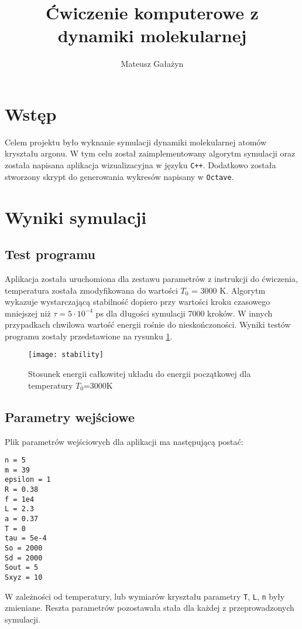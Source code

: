 \documentclass[a4paper,10pt]{article}
\author{Mateusz Gałażyn}
\title{Ćwiczenie komputerowe z dynamiki molekularnej}
\begin{document}
	\maketitle
	\section{Wstęp}
	Celem projektu było wyknanie symulacji dynamiki molekularnej atomów kryształu argonu. W tym celu został zaimplementowany algorytm symulacji oraz została napisana aplikacja wizualizacyjna w języku \verb|C++|. Dodatkowo została stworzony skrypt do generowania wykresów napisany w \verb|Octave|.
	\section{Wyniki symulacji}
	\subsection{Test programu}
	Aplikacja została uruchomiona dla zestawu parametrów z instrukcji do ćwiczenia, temperatura została zmodyfikowana do wartości $T_0$ = 3000 K. Algorytm wykazuje wystarczającą stabilność dopiero przy wartości kroku czasowego mniejszej niż $\tau = 5 \cdot 10^{-4}$ ps dla długości symulacji 7000 kroków. W innych przypadkach chwilowa wartość energii rośnie do nieskończoności. Wyniki testów programu zostały przedstawione na rysunku \ref{performance}.
	\begin{figure}[h]
	    \centering
	    \texttt{[image: stability]}
	    \caption{Stosunek energii całkowitej układu do energii początkowej dla temperatury $T_0$=3000K}
		\label{performance}
	\end{figure}
	\subsection{Parametry wejściowe}
	Plik parametrów wejściowych dla aplikacji ma następującą postać:
	\begin{verbatim}
n = 5
m = 39
epsilon = 1
R = 0.38
f = 1e4
L = 2.3
a = 0.37
T = 0
tau = 5e-4
So = 2000
Sd = 2000
Sout = 5
Sxyz = 10
	\end{verbatim}
	W zależności od temperatury, lub wymiarów kryształu parametry \verb|T|, \verb|L|, \verb|n| były zmieniane. Reszta parametrów pozostawała stała dla każdej z przeprowadzonych symulacji.
\end{document}
